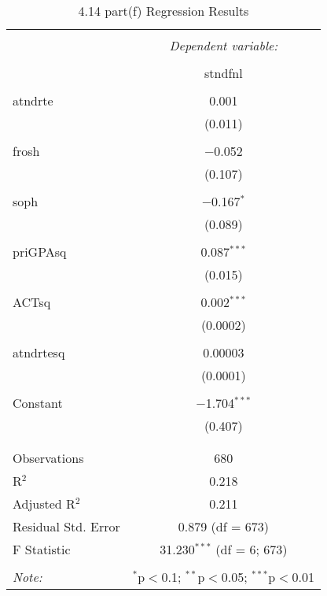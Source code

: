 \documentclass[11pt]{article} %
\begin{document}
  \begin{table}[!htbp] \centering 
    \caption{4.14 part(f) Regression Results} 
    \label{table:4.14(f)} 
  \begin{tabular}{@{\extracolsep{5pt}}lc} 
  \\[-1.8ex]\hline 
  \hline \\[-1.8ex] 
   & \multicolumn{1}{c}{\textit{Dependent variable:}} \\ 
  \cline{2-2} 
  \\[-1.8ex] & stndfnl \\ 
  \hline \\[-1.8ex] 
   atndrte & 0.001 \\ 
    & (0.011) \\ 
    & \\ 
   frosh & $-$0.052 \\ 
    & (0.107) \\ 
    & \\ 
   soph & $-$0.167$^{*}$ \\ 
    & (0.089) \\ 
    & \\ 
   priGPAsq & 0.087$^{***}$ \\ 
    & (0.015) \\ 
    & \\ 
   ACTsq & 0.002$^{***}$ \\ 
    & (0.0002) \\ 
    & \\ 
   atndrtesq & 0.00003 \\ 
    & (0.0001) \\ 
    & \\ 
   Constant & $-$1.704$^{***}$ \\ 
    & (0.407) \\ 
    & \\ 
  \hline \\[-1.8ex] 
  Observations & 680 \\ 
  R$^{2}$ & 0.218 \\ 
  Adjusted R$^{2}$ & 0.211 \\ 
  Residual Std. Error & 0.879 (df = 673) \\ 
  F Statistic & 31.230$^{***}$ (df = 6; 673) \\ 
  \hline 
  \hline \\[-1.8ex] 
  \textit{Note:}  & \multicolumn{1}{r}{$^{*}$p$<$0.1; $^{**}$p$<$0.05; $^{***}$p$<$0.01} \\ 
  \end{tabular} 
  \end{table} 
\end{document}
